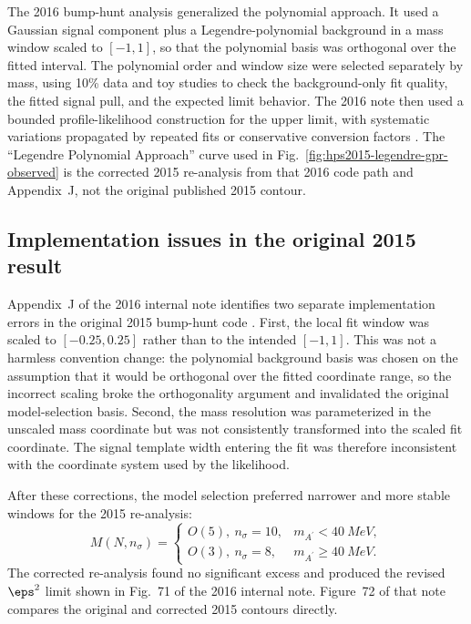 The 2016 bump-hunt analysis generalized the polynomial approach.  It used a Gaussian
signal component plus a Legendre-polynomial background in a mass window scaled to
$[-1,1]$, so that the polynomial basis was orthogonal over the fitted interval.  The
polynomial order and window size were selected separately by mass, using 10\% data and
toy studies to check the background-only fit quality, the fitted signal pull, and the
expected limit behavior.  The 2016 note then used a bounded profile-likelihood
\CLs{} construction for the upper limit, with systematic variations propagated by
repeated fits or conservative conversion factors \cite{HPS2016BumpInternal}.  The
``Legendre Polynomial Approach'' curve used in Fig.~\ref{fig:hps2015-legendre-gpr-observed}
is the corrected 2015 re-analysis from that 2016 code path and Appendix~J, not the
original published 2015 contour.

\subsection{Implementation issues in the original 2015 result}

Appendix~J of the 2016 internal note identifies two separate implementation errors in
the original 2015 bump-hunt code \cite{HPS2016BumpInternal}.  First, the local fit
window was scaled to $[-0.25,0.25]$ rather than to the intended $[-1,1]$.  This was not
a harmless convention change: the polynomial background basis was chosen on the
assumption that it would be orthogonal over the fitted coordinate range, so the
incorrect scaling broke the orthogonality argument and invalidated the original
model-selection basis.  Second, the mass resolution was parameterized in the unscaled
mass coordinate but was not consistently transformed into the scaled fit coordinate.
The signal template width entering the fit was therefore inconsistent with the
coordinate system used by the likelihood.

After these corrections, the model selection preferred narrower and more stable
windows for the 2015 re-analysis:
\begin{equation}
M(N,n_\sigma)=
\begin{cases}
O(5),~n_\sigma=10, & m_{A^\prime}<\SI{40}{MeV},\\
O(3),~n_\sigma=8, & m_{A^\prime}\ge \SI{40}{MeV}.
\end{cases}
\end{equation}
The corrected re-analysis found no significant excess and produced the revised
$\eps^2$ limit shown in Fig.~71 of the 2016 internal note.  Figure~72 of that note
compares the original and corrected 2015 contours directly.

